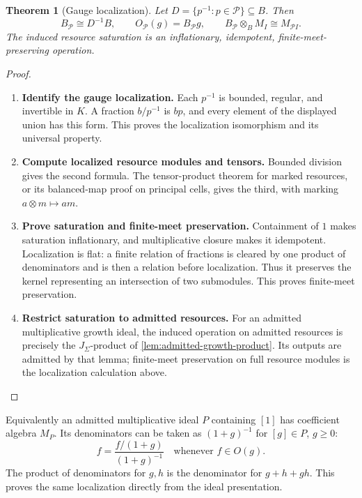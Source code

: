 \documentclass[11pt,a4paper]{article}
\numberwithin{algorithm}{section}
\numberwithin{equation}{section}
\newtheorem{theorem}{Theorem}[section]
\theoremstyle{definition}
\theoremstyle{remark}
\theoremstyle{plain}
\newcommand{\J}{J_{\Sigma}}
\theoremstyle{definition}
\theoremstyle{plain}
\begin{document}
\begin{theorem}[Gauge localization]\label{thm:gauge}
Let $D=\{p^{-1}:p\in\mathcal P\}\subseteq B$.
Then
\begin{equation}\label{eq:gauges}
 B_{\mathcal P}\cong D^{-1}B,\qquad
 O_{\mathcal P}(g)=B_{\mathcal P}g,\qquad
 B_{\mathcal P}\otimes_BM_I\cong M_{\mathcal P I}.
\end{equation}
The induced resource saturation is an inflationary,
idempotent, finite-meet-preserving operation.
\end{theorem}
\begin{proof}\leavevmode
\begin{enumerate}[leftmargin=*,align=left]
\item \textbf{Identify the gauge localization.}
Each $p^{-1}$ is bounded, regular, and invertible in $K$.
A fraction $b/p^{-1}$ is $bp$, and every element of the
displayed union has this form. This proves the localization
isomorphism and its universal property.

\item \textbf{Compute localized resource modules and tensors.}
Bounded division gives
the second formula. The tensor-product theorem for marked
resources, or its balanced-map proof on principal cells,
gives the third, with marking $a\otimes m\mapsto am$.

\item \textbf{Prove saturation and finite-meet preservation.}
Containment of $1$ makes saturation inflationary, and
multiplicative closure makes it idempotent. Localization is
flat: a finite relation of fractions is cleared by one product
of denominators and is then a relation before localization.
Thus it preserves the kernel representing an intersection
of two submodules. This proves finite-meet preservation.

\item \textbf{Restrict saturation to admitted resources.}
For an admitted multiplicative growth ideal, the induced operation
on admitted resources is precisely the $\J$-product of
\cref{lem:admitted-growth-product}. Its outputs are admitted by that
lemma; finite-meet preservation on full resource modules is the
localization calculation above.
\end{enumerate}
\end{proof}

Equivalently an admitted multiplicative ideal $P$ containing
$[1]$ has coefficient algebra $M_P$. Its denominators can be
taken as $(1+g)^{-1}$ for $[g]\in P$, $g\ge0$:
\[
 f=\frac{f/(1+g)}{(1+g)^{-1}}\quad\text{whenever }f\in O(g).
\]
The product of denominators for $g,h$ is the denominator for
$g+h+gh$. This proves the same localization directly from
the ideal presentation.
\end{document}
